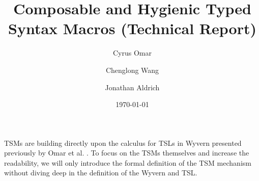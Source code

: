 \documentclass[12pt]{article}
\title{Composable and Hygienic Typed Syntax Macros (Technical Report)}
\author{Cyrus Omar \and Chenglong Wang \and Jonathan Aldrich}
\date{\today}
\begin{document}
\renewcommand*{\thepage}{title-\arabic{page}} 
\maketitle
\renewcommand*{\thepage}{\arabic{page}} 
\appendix

TSMs are building directly upon the calculus for TSLs in Wyvern presented previously by Omar et al. \cite{TSLs}. To focus on the TSMs themselves and increase the readability, we will only introduce the formal definition of the TSM mechanism without diving deep in the definition of the Wyvern and TSL.





\FloatBarrier


\end{document}

